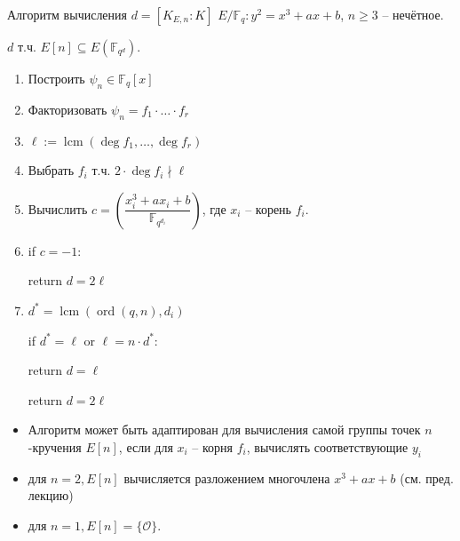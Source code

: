 \documentclass{beamer}
\begin{document}
\begin{frame}{Алгоритм вычисления $d = [K_{E,n}:K]$}
	 $ E/\mathbb{F}_q: y^2 = x^3 + a x + b$, $n \geqslant 3$ -- нечётное.
	
	 $d$ т.ч. $E[n] \subseteq E(\mathbb{F}_{q^d})$.
	
	\begin{enumerate}
		\item Построить $\psi_n \in \mathbb{F}_q[x]$
		\item Факторизовать $\psi_n = {f_1} \cdot \ldots \cdot {f_r}$
		\item $\ell := \operatorname{lcm}(\deg{f_1}, \ldots, \deg{f_r})$
		\item Выбрать $f_i$ т.ч. $2 \cdot \deg {f_i} \nmid \ell$
		\item Вычислить $c = \left(\dfrac{x_i^3 + a {x_i} + b}{\mathbb{F}_{q^{d_i}}}\right)$, где $x_i$ -- корень $f_i$.
		
		\item if $c = - 1$:
		
		\quad return $d = 2\ell$
		
		\item ${d^*} = \operatorname{lcm}( \operatorname{ord} ({q,n}),{d_i})$
		
		if ${d^*} = \ell$ or $\ell = n \cdot {d^*}$:
		
		\quad return $d = \ell$
		
		return $d = 2\ell$ 
	\end{enumerate}
\end{frame}

\begin{frame}{}
	\begin{itemize}
		\item Алгоритм может быть адаптирован для вычисления самой группы точек $n$-кручения $E[ n]$, если для ${x_i}$ -- корня ${f_i}$, вычислять соответствующие ${y_i}$
		\item для $n = 2, E[n]$ вычисляется разложением многочлена ${x^3} + a x + b$ (см.  пред. лекцию)
		\item для $n = 1, E[n] = \{ \mathcal{O} \}$. 
	\end{itemize}
\end{frame}
\end{document}
